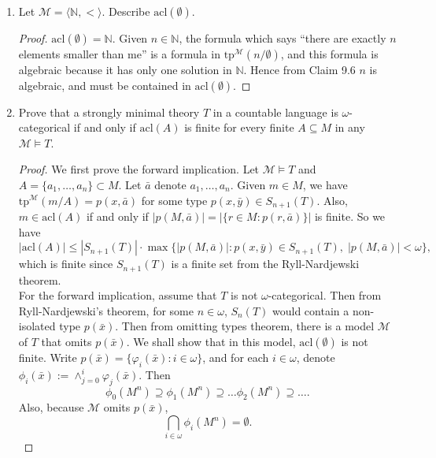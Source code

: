 \documentclass{article}
\begin{document}
\begin{enumerate}[label={\bf Q\arabic*:}]
\begin{proof}
      Thus, $T$ is strongly minimal.
    \end{proof}

  \item Let $\mathcal{M}=\langle\mathbb{N},<\rangle$. Describe
    $\text{acl}(\emptyset)$.

    \begin{proof}
      $\text{acl}(\emptyset)=\mathbb{N}$. Given $n\in\mathbb{N}$, the
      formula which says ``there are exactly $n$ elements
      smaller than me'' is a formula in
      $\text{tp}^\mathcal{M}(n/\emptyset)$, and this formula is algebraic
      because it has only one solution in $\mathbb{N}$. Hence from Claim
      9.6 $n$ is algebraic, and must be contained in
      $\text{acl}(\emptyset)$.
    \end{proof}

  \item Prove that a strongly minimal theory $T$ in a countable language is
    $\omega$-categorical if and only if $\text{acl}(A)$ is finite for
    every finite $A\subseteq M$ in any $\mathcal{M}\models T$. 

    \begin{proof}
      We first prove the forward implication. Let $\mathcal{M}\models T$
      and $A=\{a_1,\ldots,a_n\}\subset M$. Let $\bar{a}$ denote
      $a_1,\ldots,a_n$. Given $m\in M$, we have
      $\text{tp}^\mathcal{M}(m/A)=p(x,\bar{a})$ for some type
      $p(x,\bar{y})\in S_{n+1}(T)$. Also, $m\in\text{acl}(A)$ if and only
      if $|p(M,\bar{a})|=|\{r\in M: p(r,\bar{a})\}|$ is finite. So we have
      \[|\text{acl}(A)|\leq|S_{n+1}(T)|\cdot
      \max\{|p(M,\bar{a})|:p(x,\bar{y})\in S_{n+1}(T),\;
      |p(M,\bar{a})|<\omega\},\] which is finite since $S_{n+1}(T)$ is a
      finite set from the Ryll-Nardjewski theorem. \\

      For the forward implication, assume that $T$ is not
      $\omega$-categorical. Then from Ryll-Nardjewski's theorem, for some
      $n\in\omega$, $S_n(T)$ would contain a non-isolated type
      $p(\bar{x})$. Then from omitting types theorem, there is a model
      $\mathcal{M}$ of $T$ that omits $p(\bar{x})$. We shall show that in
      this model, $\text{acl}(\emptyset)$ is not finite. Write
      $p(\bar{x})=\{\varphi_i(\bar{x}):i\in\omega\}$, and for each
      $i\in\omega$, denote
      $\phi_i(\bar{x}):=\wedge_{j=0}^i\varphi_j(\bar{x})$. Then
      \[\phi_0(M^n)\supseteq \phi_1(M^n)\supseteq\ldots
      \phi_2(M^n)\supseteq\ldots.\] Also, 
      because $\mathcal{M}$ omits $p(\bar{x})$,
      \[\bigcap_{i\in\omega} \phi_i(M^n) =\emptyset.\]


\end{proof}
\end{enumerate}
\end{document}
